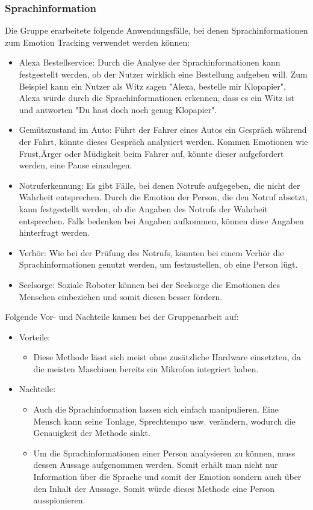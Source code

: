 \subsubsection{Sprachinformation}
Die Gruppe erarbeitete folgende Anwendungsfälle, bei denen Sprachinformationen zum Emotion Tracking verwendet werden können:
\begin{itemize}
	\item Alexa Bestellservice: Durch die Analyse der Sprachinformationen kann festgestellt werden, ob der Nutzer wirklich eine Bestellung aufgeben will. Zum Beispiel kann ein Nutzer als Witz sagen "Alexa, bestelle mir Klopapier", Alexa würde durch die Sprachinformationen erkennen, dass es ein Witz ist und antworten "Du hast doch noch genug Klopapier".
	\item Gemütszustand im Auto: Führt der Fahrer eines Autos ein Gespräch während der Fahrt, könnte dieses Gespräch analysiert werden. Kommen Emotionen wie Frust,Ärger oder Müdigkeit beim Fahrer auf, könnte dieser aufgefordert werden, eine Pause einzulegen.
	\item Notruferkennung: Es gibt Fälle, bei denen Notrufe aufgegeben, die nicht der Wahrheit entsprechen. Durch die Emotion der Person, die den Notruf absetzt, kann festgestellt werden, ob die Angaben des Notrufs der Wahrheit entsprechen. Falls bedenken bei Angaben aufkommen, können diese Angaben hinterfragt werden.
	\item  Verhör: Wie bei der Prüfung des Notrufs, könnten bei einem Verhör die Sprachinformationen genutzt werden, um festzustellen, ob eine Person lügt.
	\item Seelsorge: Soziale Roboter können bei der Seelsorge die Emotionen des Menschen einbeziehen und somit diesen besser fördern.
\end{itemize}
Folgende Vor- und Nachteile kamen bei der Gruppenarbeit auf:
\begin{itemize}
	\item Vorteile:
	\begin{itemize}
		\item Diese Methode lässt sich meist ohne zusätzliche Hardware einsetzten, da die meisten Maschinen bereits ein Mikrofon integriert haben.		 
	\end{itemize}
	\item Nachteile:
	\begin{itemize}
		\item Auch die Sprachinformation lassen sich einfach manipulieren. Eine Mensch kann seine Tonlage, Sprechtempo usw. verändern, wodurch die Genauigkeit der Methode sinkt.
		\item Um die Sprachinformationen einer Person analysieren zu können, muss dessen Aussage aufgenommen werden. Somit erhält man nicht nur Information über die Sprache und somit der Emotion sondern auch über den Inhalt der Aussage. Somit würde dieses Methode eine Person ausspionieren.
	\end{itemize}
\end{itemize}


